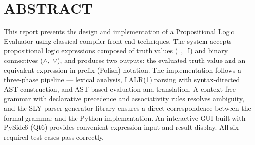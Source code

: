 \documentclass[12pt,a4paper]{report}
\begin{document}
    

    \clearpage
    \chapter*{ABSTRACT}
    This report presents the design and implementation of a Propositional Logic Evaluator using classical compiler front-end techniques. The system accepts propositional logic expressions composed of truth values (\texttt{t},~\texttt{f}) and binary connectives ($\wedge$,~$\vee$), and produces two outputs: the evaluated truth value and an equivalent expression in prefix (Polish) notation. The implementation follows a three-phase pipeline --- lexical analysis, LALR(1) parsing with syntax-directed AST construction, and AST-based evaluation and translation. A context-free grammar with declarative precedence and associativity rules resolves ambiguity, and the SLY parser-generator library ensures a direct correspondence between the formal grammar and the Python implementation. An interactive GUI built with PySide6 (Qt6) provides convenient expression input and result display. All six required test cases pass correctly.

    \clearpage
    \renewcommand{\contentsname}{%
      \normalfont\fontsize{14}{17}\bfseries\MakeUppercase{Contents}}
    \tableofcontents

    \clearpage

    
    \newpage
    
    
    
    

    \newpage
    \pagestyle{plain}
    \renewcommand{\bibsection}{%
      \chapter*{REFERENCES}%
    }
    
    

    \newpage
    
\end{document}
